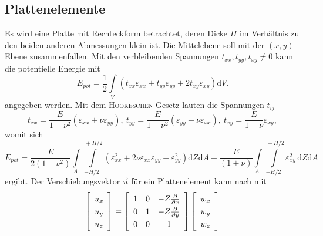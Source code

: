 \documentclass[a4paper,10pt,twoside]{article}
\numberwithin{equation}{section} %
\numberwithin{figure}{section}   %
\numberwithin{table}{section}    %
\begin{document}
	\subsection{Plattenelemente} \label{sec:platten-elemente}
	Es wird eine Platte mit Rechteckform betrachtet, deren Dicke $ H $ im Verhältnis zu den beiden anderen Abmessungen klein ist. Die Mittelebene soll mit der  $ (x,y) $-Ebene zusammenfallen. Mit den verbleibenden Spannungen $ t_{xx}, t_{yy}, t_{xy} \neq 0 $ kann die potentielle Energie mit
	\begin{equation}\label{equ:platten-pot-energie}
	E_{pot} = \frac{1}{2} \underset{V \ }{\int} \left( t_{xx}\varepsilon_{xx} + t_{yy}\varepsilon_{yy} + 2t_{xy}\varepsilon_{xy} \right) \mathrm{d}V.
	\end{equation}
	angegeben werden. Mit dem \textsc{Hookeschen} Gesetz lauten die Spannungen $ t_{ij} $
	\begin{equation}\label{equ:platten-hookgesetz}
	t_{xx} = \frac{E}{1-\nu^{2}}\left(\varepsilon_{xx}+\nu\varepsilon_{yy}\right), \ t_{yy}=\frac{E}{1-\nu^{2}}\left(\varepsilon_{yy}+\nu\varepsilon_{xx}\right), \ t_{xy}=\frac{E}{1+\nu}\varepsilon_{xy},
	\end{equation}
	womit sich
	\begin{equation}\label{equ:platten-kin-formulierung}
	E_{pot}= \frac{E}{2(1-\nu^{2})} \underset{A \ \ }{\int} \overset{\ +H/2}{\underset{-H/2 \ \ }{\int}} \left(\varepsilon_{xx}^{2}+2\nu\varepsilon_{xx}\varepsilon_{yy}+\varepsilon_{yy}^{2}\right) \mathrm{d}Z\mathrm{d}A + \frac{E}{(1+\nu)} \underset{A \ \ }{\int} \overset{ \ +H/2}{\underset{-H/2 \ \ }{\int}} \varepsilon_{xy}^{2} \, \mathrm{d}Z\mathrm{d}A
	\end{equation}
	ergibt. Der Verschiebungsvektor $ \vec{u} $ für ein Plattenelement kann nach \cite{wauer2014kontinuumsschwingungen} mit 
	\begin{equation}\label{equ:platten-verschiebungsvektor}
	\renewcommand\arraystretch{1.3}
	\left[ 
	\begin{array}{c}
	u_{x}\\
	u_{y}\\
	u_{z}
	\end{array} 
	\right] 
	=
	\left[ 
	\begin{array}{ccc}
	1 & 0 & -Z\frac{\partial}{\partial x}\\
	0 & 1 & -Z\frac{\partial}{\partial y}\\
	0 & 0 & 1
	\end{array}
	\right]
	\left[ 
	\begin{array}{c}
	w_{x}\\
	w_{y}\\
	w_{z}
	\end{array}	
	\right] 
	\end{equation}
\end{document}
